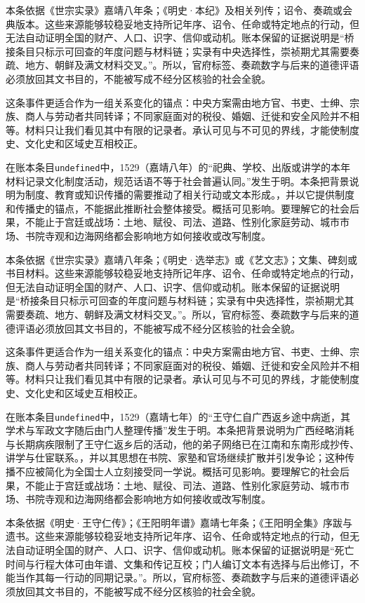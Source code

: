 本条依据《世宗实录》嘉靖八年条；《明史·本纪》及相关列传；诏令、奏疏或会典版本。这些来源能够较稳妥地支持所记年序、诏令、任命或特定地点的行动，但无法自动证明全国的财产、人口、识字、信仰或动机。账本保留的证据说明是“桥接条目只标示可回查的年度问题与材料链；实录有中央选择性，崇祯期尤其需要奏疏、地方、朝鲜及满文材料交叉。”。所以，官府标签、奏疏数字与后来的道德评语必须放回其文书目的，不能被写成不经分区核验的社会全貌。

这条事件更适合作为一组关系变化的锚点：中央方案需由地方官、书吏、士绅、宗族、商人与劳动者共同转译；不同家庭面对的税役、婚姻、迁徙和安全风险并不相等。材料只让我们看见其中有限的记录者。承认可见与不可见的界线，才能使制度史、文化史和区域史互相校正。

在账本条目\texttt{undefined}中，1529（嘉靖八年）的“祀典、学校、出版或讲学的本年材料记录文化制度活动，规范话语不等于社会普遍认同。”发生于明。本条把背景说明为制度、教育或知识传播的需要推动了相关行动或文本形成。，并以它提供制度和传播史的锚点，不能据此推断社会整体接受。概括可见影响。要理解它的社会后果，不能止于宫廷或战场：土地、赋役、司法、道路、性别化家庭劳动、城市市场、书院寺观和边海网络都会影响地方如何接收或改写制度。

本条依据《世宗实录》嘉靖八年条；《明史·选举志》或《艺文志》；文集、碑刻或书目材料。这些来源能够较稳妥地支持所记年序、诏令、任命或特定地点的行动，但无法自动证明全国的财产、人口、识字、信仰或动机。账本保留的证据说明是“桥接条目只标示可回查的年度问题与材料链；实录有中央选择性，崇祯期尤其需要奏疏、地方、朝鲜及满文材料交叉。”。所以，官府标签、奏疏数字与后来的道德评语必须放回其文书目的，不能被写成不经分区核验的社会全貌。

这条事件更适合作为一组关系变化的锚点：中央方案需由地方官、书吏、士绅、宗族、商人与劳动者共同转译；不同家庭面对的税役、婚姻、迁徙和安全风险并不相等。材料只让我们看见其中有限的记录者。承认可见与不可见的界线，才能使制度史、文化史和区域史互相校正。

在账本条目\texttt{undefined}中，1529（嘉靖七年）的“王守仁自广西返乡途中病逝，其学术与军政文字随后由门人整理传播”发生于明。本条把背景说明为广西经略消耗与长期病疾限制了王守仁返乡后的活动，他的弟子网络已在江南和东南形成抄传、讲学与仕宦联系。，并以其思想在书院、家塾和官场继续扩散并引发争论；这种传播不应被简化为全国士人立刻接受同一学说。概括可见影响。要理解它的社会后果，不能止于宫廷或战场：土地、赋役、司法、道路、性别化家庭劳动、城市市场、书院寺观和边海网络都会影响地方如何接收或改写制度。

本条依据《明史·王守仁传》；《王阳明年谱》嘉靖七年条；《王阳明全集》序跋与遗书。这些来源能够较稳妥地支持所记年序、诏令、任命或特定地点的行动，但无法自动证明全国的财产、人口、识字、信仰或动机。账本保留的证据说明是“死亡时间与行程大体可由年谱、文集和传记互校；门人编订文本有选择与后出修订，不能当作其每一行动的同期记录。”。所以，官府标签、奏疏数字与后来的道德评语必须放回其文书目的，不能被写成不经分区核验的社会全貌。

